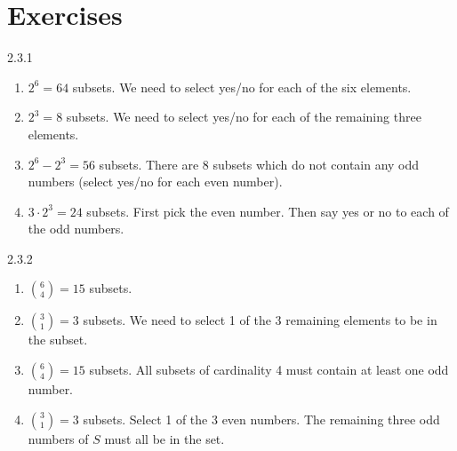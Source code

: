 \documentclass[11pt,]{book}
\theoremstyle{ptxplainnotitle}
\theoremstyle{ptxplaintitle}
\theoremstyle{ptxdefinitionnotitle}
\theoremstyle{ptxdefinitiontitle}
\theoremstyle{ptxdefinitionnotitle}
\theoremstyle{ptxdefinitiontitle}
\theoremstyle{ptxdefinitionnotitle}
\theoremstyle{ptxdefinitiontitle}
\theoremstyle{ptxdefinitiontitlenonumber}
\theoremstyle{ptxdefinitiontitlenonumber}
\numberwithin{equation}{chapter}
\begin{document}
\section*{Exercises}
\begin{divisionexercise}{2.3.1}
\textbf{}\hypertarget{p-1267}{}%
\leavevmode%
\begin{enumerate}[label=(\alph*)]
\item\hypertarget{li-541}{}\hypertarget{p-1268}{}%
\(2^6 = 64\) subsets. We need to select yes/no for each of the six elements.%
\item\hypertarget{li-542}{}\hypertarget{p-1269}{}%
\(2^3 = 8\) subsets.  We need to select yes/no for each of the remaining three elements.%
\item\hypertarget{li-543}{}\hypertarget{p-1270}{}%
\(2^6 - 2^3 = 56\) subsets.  There are 8 subsets which do not contain any odd numbers (select yes/no for each even number).%
\item\hypertarget{li-544}{}\hypertarget{p-1271}{}%
\(3\cdot 2^3 = 24\) subsets.  First pick the even number.  Then say yes or no to each of the odd numbers.%
\end{enumerate}
%
\end{divisionexercise}%
\begin{divisionexercise}{2.3.2}
\textbf{}\hypertarget{p-1289}{}%
\leavevmode%
\begin{enumerate}[label=(\alph*)]
\item\hypertarget{li-557}{}\hypertarget{p-1290}{}%
\({6\choose 4} = 15\) subsets.%
\item\hypertarget{li-558}{}\hypertarget{p-1291}{}%
\({3 \choose 1} = 3\) subsets.  We need to select 1 of the 3 remaining elements to be in the subset.%
\item\hypertarget{li-559}{}\hypertarget{p-1292}{}%
\({6 \choose 4} = 15\) subsets.  All subsets of cardinality 4 must contain at least one odd number.%
\item\hypertarget{li-560}{}\hypertarget{p-1293}{}%
\({3 \choose 1} = 3\) subsets.  Select 1 of the 3 even numbers.  The remaining three odd numbers of \(S\) must all be in the set.%
\end{enumerate}
%
\end{divisionexercise}%
\end{document}
